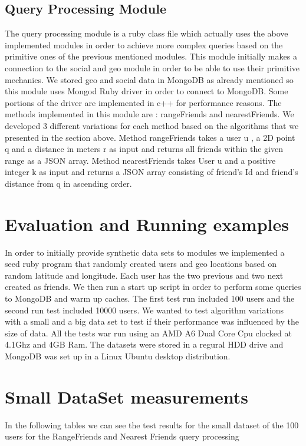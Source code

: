 \documentclass[prodmode,acmtods]{acmsmall} %
\begin{document}
\subsection{Query Processing Module}
The query processing module is a ruby class file which actually uses the above implemented modules in order to achieve more complex queries based on the primitive ones of the previous mentioned modules.
This module initially makes a connection to the social and geo module in order to be able to use their primitive mechanics. We stored geo and social data in MongoDB as already mentioned so this module uses Mongod Ruby driver in order to connect to MongoDB. Some portions of the driver are implemented in c++ for performance reasons. The methods implemented in this module are : rangeFriends and nearestFriends. We developed 3 different variations for each method based on the algorithms that we presented in the section above.
Method rangeFriends takes a user u , a 2D point q and a distance in meters r as input and returns all friends within the given range as a JSON array.
Method nearestFriends takes User u and a positive integer k as input and returns a JSON array consisting of friend's Id and friend's distance from q in ascending order.



\section{Evaluation and Running examples}
In order to initially provide synthetic data sets to modules we implemented a seed ruby program that randomly created users and geo locations based on random latitude and longitude. Each user has the two previous and two next created as friends. We then run a start up script in order to perform some queries to MongoDB and warm up caches. The first test run included 100 users and the second run test included 10000 users. We wanted to test algorithm variations with a small and a big data set to test if their performance was influenced by the size of data. All the tests war run using an AMD A6 Dual Core Cpu clocked at 4.1Ghz and 4GB Ram. The datasets were stored in a regural HDD drive and MongoDB was set up in a Linux Ubuntu desktop distribution.

\section{Small DataSet measurements}
In the following tables we can see the test results for the small dataset of the 100 users
for the RangeFriends and Nearest Friends query processing
\newline
\end{document}
